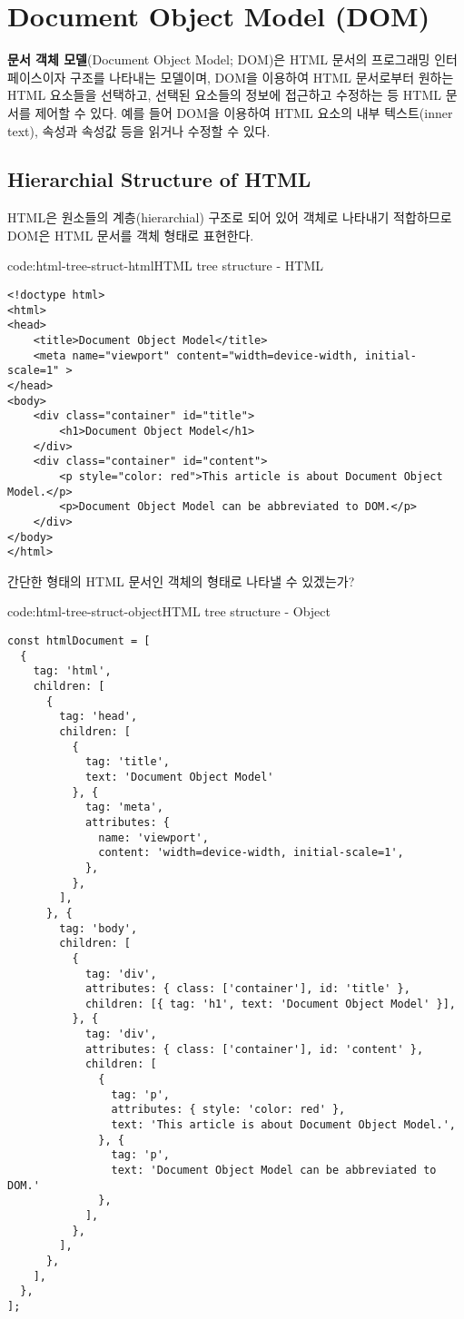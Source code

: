 \section{Document Object Model (DOM)}\label{sect:dom}

\textbf{문서 객체 모델}(Document Object Model; DOM)은 HTML 문서의 프로그래밍 인터페이스이자 구조를 나타내는 모델이며, DOM을 이용하여 HTML 문서로부터 원하는 HTML 요소들을 선택하고, 선택된 요소들의 정보에 접근하고 수정하는 등 HTML 문서를 제어할 수 있다. 예를 들어 DOM을 이용하여 HTML 요소의 내부 텍스트(inner text), 속성과 속성값 등을 읽거나 수정할 수 있다.

\subsection*{Hierarchial Structure of HTML}

HTML은 원소들의 계층(hierarchial) 구조로 되어 있어 객체로 나타내기 적합하므로 DOM은 HTML 문서를 객체 형태로 표현한다.

\begin{code}{code:html-tree-struct-html}{HTML tree structure - HTML}
\begin{verbatim}
<!doctype html>
<html>
<head>
    <title>Document Object Model</title>
    <meta name="viewport" content="width=device-width, initial-scale=1" >
</head>
<body>
    <div class="container" id="title">
        <h1>Document Object Model</h1>
    </div>
    <div class="container" id="content">
        <p style="color: red">This article is about Document Object Model.</p>
        <p>Document Object Model can be abbreviated to DOM.</p>
    </div>
</body>
</html>
\end{verbatim}
\end{code}

간단한 형태의 HTML 문서인 \을 객체의 형태로 나타낼 수 있겠는가?

\begin{code}{code:html-tree-struct-object}{HTML tree structure - Object}
\begin{verbatim}
const htmlDocument = [
  {
    tag: 'html',
    children: [
      {
        tag: 'head',
        children: [
          {
            tag: 'title',
            text: 'Document Object Model'
          }, {
            tag: 'meta',
            attributes: {
              name: 'viewport',
              content: 'width=device-width, initial-scale=1',
            },
          },
        ],
      }, {
        tag: 'body',
        children: [
          {
            tag: 'div',
            attributes: { class: ['container'], id: 'title' },
            children: [{ tag: 'h1', text: 'Document Object Model' }],
          }, {
            tag: 'div',
            attributes: { class: ['container'], id: 'content' },
            children: [
              {
                tag: 'p',
                attributes: { style: 'color: red' },
                text: 'This article is about Document Object Model.',
              }, {
                tag: 'p',
                text: 'Document Object Model can be abbreviated to DOM.'
              },
            ],
          },
        ],
      },
    ],
  },
];
\end{verbatim}
\end{code}


